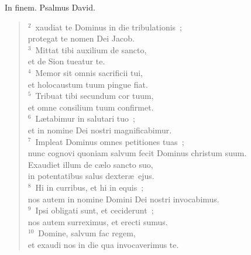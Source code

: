 \bchapter[Psalm]
In finem. Psalmus David.
\begin{verse}${}^{2}$~xaudiat te Dominus in die tribulationis~;\\ protegat te nomen Dei Jacob.\\
${}^{3}$~Mittat tibi auxilium de sancto,\\ et de Sion tueatur te.\\
${}^{4}$~Memor sit omnis sacrificii tui,\\ et holocaustum tuum pingue fiat.\\
${}^{5}$~Tribuat tibi secundum cor tuum,\\ et omne consilium tuum confirmet.\\
${}^{6}$~L\ae tabimur in salutari tuo~;\\ et in nomine Dei nostri magnificabimur.\\
${}^{7}$~Impleat Dominus omnes petitiones tuas~;\\ nunc cognovi quoniam salvum fecit Dominus christum suum.\\ Exaudiet illum de c\ae lo sancto suo,\\ in potentatibus salus dexter\ae\ ejus.\\
${}^{8}$~Hi in curribus, et hi in equis~;\\ nos autem in nomine Domini Dei nostri invocabimus.\\
${}^{9}$~Ipsi obligati sunt, et ceciderunt~;\\ nos autem surreximus, et erecti sumus.\\
${}^{10}$~Domine, salvum fac regem,\\ et exaudi nos in die qua invocaverimus te.\end{verse}




